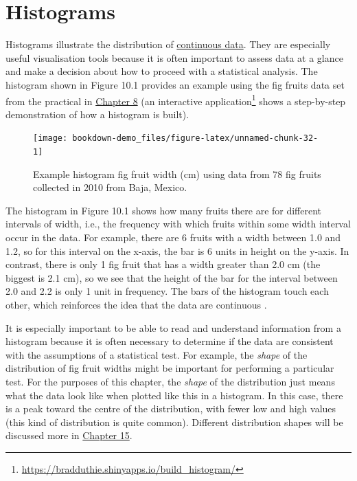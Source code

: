 \documentclass[
  openany]{krantz}
\begin{document}
\hypertarget{histograms}{%
\section{Histograms}\label{histograms}}

Histograms illustrate the distribution of \protect\hyperlink{Chapter_5}{continuous data}.
They are especially useful visualisation tools because it is often important to assess data at a glance and make a decision about how to proceed with a statistical analysis.
The histogram shown in Figure 10.1 provides an example using the fig fruits data set from the practical in \protect\hyperlink{Chapter_8}{Chapter 8} (an interactive application\footnote{\url{https://bradduthie.shinyapps.io/build_histogram/}} shows a step-by-step demonstration of how a histogram is built).

\begin{figure}
\texttt{[image: bookdown-demo\_files/figure-latex/unnamed-chunk-32-1]} \caption{Example histogram fig fruit width (cm) using data from 78 fig fruits collected in 2010 from Baja, Mexico.}\label{fig:unnamed-chunk-32}
\end{figure}

The histogram in Figure 10.1 shows how many fruits there are for different intervals of width, i.e., the frequency with which fruits within some width interval occur in the data.
For example, there are 6 fruits with a width between 1.0 and 1.2, so for this interval on the x-axis, the bar is 6 units in height on the y-axis.
In contrast, there is only 1 fig fruit that has a width greater than 2.0 cm (the biggest is 2.1 cm), so we see that the height of the bar for the interval between 2.0 and 2.2 is only 1 unit in frequency.
The bars of the histogram touch each other, which reinforces the idea that the data are continuous \citep{Dytham2011, Sokal1995}.

It is especially important to be able to read and understand information from a histogram because it is often necessary to determine if the data are consistent with the assumptions of a statistical test.
For example, the \emph{shape} of the distribution of fig fruit widths might be important for performing a particular test.
For the purposes of this chapter, the \emph{shape} of the distribution just means what the data look like when plotted like this in a histogram.
In this case, there is a peak toward the centre of the distribution, with fewer low and high values (this kind of distribution is quite common).
Different distribution shapes will be discussed more in \protect\hyperlink{Chapter_15}{Chapter 15}.
\end{document}
